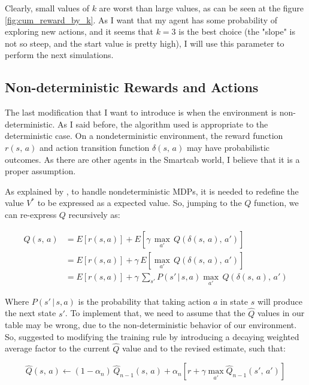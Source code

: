 \documentclass[a4paper]{article}
\begin{document}
Clearly, small values of $k$ are worst than large values, as can be seen at the figure \ref{fig:cum_reward_by_k}. As I want that my agent has some probability of exploring new actions, and it seems that $k=3$ is the best choice (the "slope" is not so steep, and the start value is pretty high), I will use this parameter to perform the next simulations.

\subsection{Non-deterministic Rewards and Actions}
The last modification that I want to introduce is when the environment is non-deterministic. As I said before, the algorithm used is appropriate to the deterministic case. On a nondeterministic environment, the reward function $r(s,\,a)$ and action transition function $\delta(s,\,a)$ may have probabilistic outcomes. As there are other agents in the Smartcab world, I believe that it is a proper assumption.

As explained by \cite{Mitchell}, to handle nondeterministic MDPs, it is needed to redefine the value $V^{*}$ to be expressed as a expected value. So, jumping to the $Q$ function, we can re-express $Q$ recursively as:

\begin{equation}
\begin{aligned}
Q(s, \, a) &= E \left [r(s, a) \right ] + E \left [\gamma \, \underset{a'}{\max} \, Q(\delta(s,\, a), \, a')\right ]\\
&= E \left [r(s, a) \right ] + \gamma \,  E \left [\underset{a'}{\max} \, Q(\delta(s,\, a), \, a')\right ]\\
&= E \left [r(s, a) \right ] + \gamma \,  \sum_{s'} P\left(s' \,| \,s, a   \right) \underset{a'}{\max} \, Q(\delta(s,\, a), \, a')
\end{aligned}
\end{equation}

Where $P\left(s' \,| \,s, a   \right)$ is the probability that taking action $a$ in state $s$ will produce the next state $s'$. To implement that, we need to assume that the $\hat{Q}$ values in our table may be wrong, due to the non-deterministic behavior of our environment. So, \cite{Mitchell} suggested to modifying the training rule by introducing a decaying weighted average factor to the current $\hat{Q}$ value and to the revised estimate, such that:

$$\hat{Q}(s, \, a) \leftarrow  (1 - \alpha_{n})\, \hat{Q}_{n-1}(s, \, a) +  \alpha_{n}\left[ r + \gamma \underset{a'}{\max} \hat{Q}_{n-1}(s', \, a') \right ]$$
\end{document}
